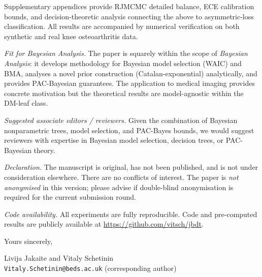 \documentclass[12pt,a4paper]{article}
\begin{document}
Supplementary appendices provide RJMCMC detailed balance, ECE calibration bounds,
and decision-theoretic analysis connecting the above to asymmetric-loss classification.
All results are accompanied by numerical verification on both synthetic and
real knee osteoarthritis data.

\medskip\noindent\textit{Fit for Bayesian Analysis.}\quad
The paper is squarely within the scope of \textit{Bayesian Analysis}:
it develops methodology for Bayesian model selection (WAIC) and BMA,
analyses a novel prior construction (Catalan-exponential) analytically,
and provides PAC-Bayesian guarantees.
The application to medical imaging provides concrete motivation but the
theoretical results are model-agnostic within the DM-leaf class.

\medskip\noindent\textit{Suggested associate editors / reviewers.}\quad
Given the combination of Bayesian nonparametric trees, model selection,
and PAC-Bayes bounds, we would suggest reviewers with expertise in
Bayesian model selection, decision trees, or PAC-Bayesian theory.

\medskip\noindent\textit{Declaration.}\quad
The manuscript is original, has not been published, and is not under
consideration elsewhere.
There are no conflicts of interest.
The paper is \textit{not anonymised} in this version; please advise if
double-blind anonymisation is required for the current submission round.

\medskip\noindent\textit{Code availability.}\quad
All experiments are fully reproducible.
Code and pre-computed results are publicly available at
\url{https://github.com/vitsch/jbdt}.

\bigskip
\noindent Yours sincerely,

\bigskip\bigskip
\noindent
Livija Jakaite and Vitaly Schetinin\\
\texttt{Vitaly.Schetinin@beds.ac.uk} (corresponding author)
\end{document}

